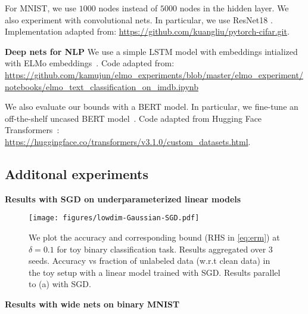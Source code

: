 For MNIST, we use $1000$ nodes instead of $5000$ nodes in the hidden layer. 
% 
We also experiment with convolutional nets. In particular, we use ResNet18 \citep{he2016deep}. Implementation adapted from:  \url{https://github.com/kuangliu/pytorch-cifar.git}. 

\textbf{Deep nets for NLP {} {}} We use a simple LSTM model with embeddings intialized with ELMo embeddings~\citep{Peters:2018}. Code adapted from: \url{https://github.com/kamujun/elmo_experiments/blob/master/elmo_experiment/notebooks/elmo_text_classification_on_imdb.ipynb} 

We also evaluate our bounds with a BERT model. In particular, we fine-tune an off-the-shelf uncased BERT model~\citep{devlin2018bert}. Code adapted from Hugging Face Transformers~\citep{wolf-etal-2020-transformers}: \url{https://huggingface.co/transformers/v3.1.0/custom_datasets.html}. 


\subsection{Additonal experiments}

\textbf{Results with SGD on underparameterized linear models {} {}} 

\begin{figure*}[h]
    \centering 
    \texttt{[image: figures/lowdim-Gaussian-SGD.pdf]}
    \vspace{-5pt}
    \caption{ 
    We plot the accuracy and corresponding bound 
    (RHS in \eqref{eq:erm}) at $\delta = 0.1$
    for toy binary classification task. 
    Results aggregated over $3$ seeds. 
    Accuracy vs fraction of unlabeled data (w.r.t clean data) 
    in the toy setup with a linear model trained with SGD. Results parallel to (a) with SGD.  }
    \label{fig:error_binary_linear}
    \vspace{-5pt}
\end{figure*}

\textbf{Results with wide nets on binary MNIST {} {}}

